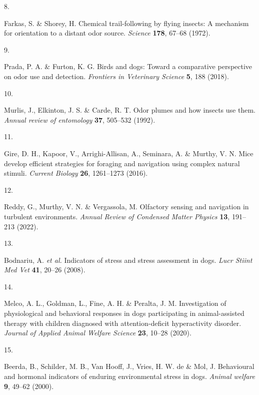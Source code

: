 \documentclass[
]{article}
\newlength{\cslhangindent}
\newlength{\csllabelwidth}
\newlength{\cslentryspacingunit} %
\newenvironment{CSLReferences}[2] %
 {%
  \setlength{\parindent}{0pt}
  \ifodd #1
  \let\oldpar\par
  \def\par{\hangindent=\cslhangindent\oldpar}
  \fi
  \setlength{\parskip}{#2\cslentryspacingunit}
 }%
 {}
\newcommand{\CSLLeftMargin}[1]{\parbox[t]{\csllabelwidth}{#1}}
\newcommand{\CSLRightInline}[1]{\parbox[t]{\linewidth - \csllabelwidth}{#1}\break}
\begin{document}
\begin{CSLReferences}{0}{0}
\leavevmode{}%
\CSLLeftMargin{8. }%
\CSLRightInline{Farkas, S. \& Shorey, H. Chemical trail-following by flying insects: A mechanism for orientation to a distant odor source. \emph{Science} \textbf{178}, 67--68 (1972).}

\leavevmode{}%
\CSLLeftMargin{9. }%
\CSLRightInline{Prada, P. A. \& Furton, K. G. Birds and dogs: Toward a comparative perspective on odor use and detection. \emph{Frontiers in Veterinary Science} \textbf{5}, 188 (2018).}

\leavevmode{}%
\CSLLeftMargin{10. }%
\CSLRightInline{Murlis, J., Elkinton, J. S. \& Carde, R. T. Odor plumes and how insects use them. \emph{Annual review of entomology} \textbf{37}, 505--532 (1992).}

\leavevmode{}%
\CSLLeftMargin{11. }%
\CSLRightInline{Gire, D. H., Kapoor, V., Arrighi-Allisan, A., Seminara, A. \& Murthy, V. N. Mice develop efficient strategies for foraging and navigation using complex natural stimuli. \emph{Current Biology} \textbf{26}, 1261--1273 (2016).}

\leavevmode{}%
\CSLLeftMargin{12. }%
\CSLRightInline{Reddy, G., Murthy, V. N. \& Vergassola, M. Olfactory sensing and navigation in turbulent environments. \emph{Annual Review of Condensed Matter Physics} \textbf{13}, 191--213 (2022).}

\leavevmode{}%
\CSLLeftMargin{13. }%
\CSLRightInline{Bodnariu, A. \emph{et al.} Indicators of stress and stress assessment in dogs. \emph{Lucr Stiint Med Vet} \textbf{41}, 20--26 (2008).}

\leavevmode{}%
\CSLLeftMargin{14. }%
\CSLRightInline{Melco, A. L., Goldman, L., Fine, A. H. \& Peralta, J. M. Investigation of physiological and behavioral responses in dogs participating in animal-assisted therapy with children diagnosed with attention-deficit hyperactivity disorder. \emph{Journal of Applied Animal Welfare Science} \textbf{23}, 10--28 (2020).}

\leavevmode{}%
\CSLLeftMargin{15. }%
\CSLRightInline{Beerda, B., Schilder, M. B., Van Hooff, J., Vries, H. W. de \& Mol, J. Behavioural and hormonal indicators of enduring environmental stress in dogs. \emph{Animal welfare} \textbf{9}, 49--62 (2000).}


\end{CSLReferences}
\end{document}
